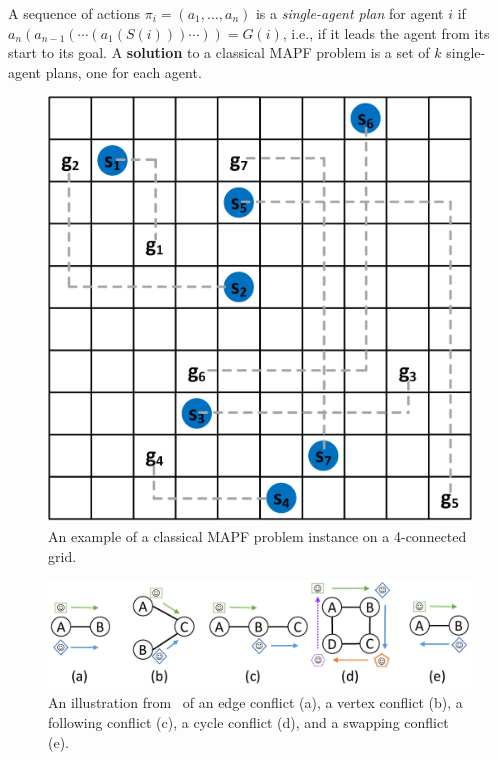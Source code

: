 \documentclass[review]{elsarticle}
\newcommand{\target}{\ensuremath{G}\xspace}
\newcommand{\source}{\ensuremath{S}\xspace}
\newcommand\konstantin[1]{\nb{\textbf{Konstantin:}}{red}{#1}}
\newcommand\roni[1]{\nb{\textbf{Roni:}}{green}{#1}}
\begin{document}
A sequence of actions $\pi_i=(a_1,\ldots,a_n)$ 
is a \emph{single-agent plan} for agent $i$ 
if $a_n(a_{n-1}(\cdots(a_1(\source(i)))\cdots))=\target(i)$, i.e., if it leads the agent from its start to its goal. A \textbf{solution} to a classical MAPF problem is a set of $k$ single-agent plans, one for each agent.  



\begin{figure}
    \centering
    \includegraphics[width=0.5\linewidth]{classical-mapf-grid-example.png}
    \caption{An example of a classical MAPF problem instance on a 4-connected grid.}
    \label{fig:classical-mapf}
\end{figure}

\begin{figure}
    \centering
    \includegraphics[width=\columnwidth]{types-of-conflicts.pdf}
    \caption{An illustration from~\cite{stern2019mapf} of an edge conflict (a), a vertex conflict (b), a following conflict (c), a cycle conflict (d), and a swapping conflict (e).}
    \label{fig:types-of-conflicts}
\end{figure}
\end{document}
